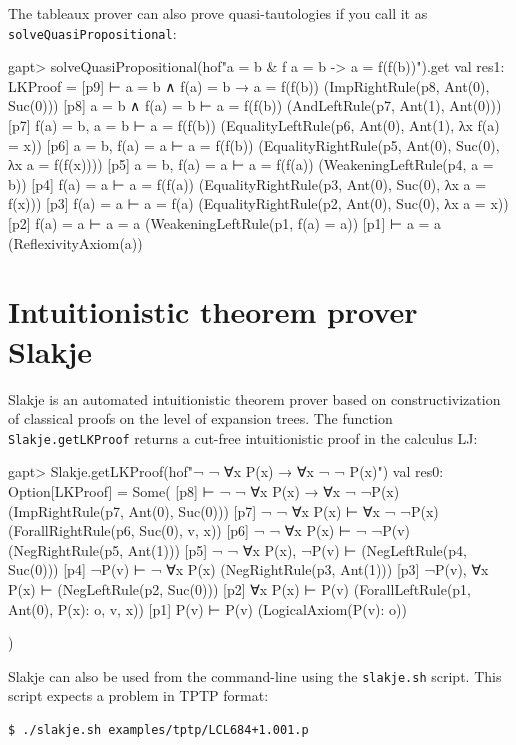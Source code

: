 \documentclass[a4paper,11pt]{book}
\begin{document}
The tableaux prover can also prove quasi-tautologies if you call it as \texttt{solveQuasiPropositional}:
\begin{clilisting}
gapt> solveQuasiPropositional(hof"a = b & f a = b -> a = f(f(b))").get
val res1: LKProof = [p9]  ⊢ a = b ∧ f(a) = b → a = f(f(b))    (ImpRightRule(p8, Ant(0), Suc(0)))
[p8] a = b ∧ f(a) = b ⊢ a = f(f(b))    (AndLeftRule(p7, Ant(1), Ant(0)))
[p7] f(a) = b, a = b ⊢ a = f(f(b))    (EqualityLeftRule(p6, Ant(0), Ant(1), λx f(a) = x))
[p6] a = b, f(a) = a ⊢ a = f(f(b))    (EqualityRightRule(p5, Ant(0), Suc(0), λx a = f(f(x))))
[p5] a = b, f(a) = a ⊢ a = f(f(a))    (WeakeningLeftRule(p4, a = b))
[p4] f(a) = a ⊢ a = f(f(a))    (EqualityRightRule(p3, Ant(0), Suc(0), λx a = f(x)))
[p3] f(a) = a ⊢ a = f(a)    (EqualityRightRule(p2, Ant(0), Suc(0), λx a = x))
[p2] f(a) = a ⊢ a = a    (WeakeningLeftRule(p1, f(a) = a))
[p1]  ⊢ a = a    (ReflexivityAxiom(a))

\end{clilisting}

\section{Intuitionistic theorem prover Slakje}

Slakje is an automated intuitionistic theorem prover based on
constructivization of classical proofs on the level of expansion trees.  The
function \texttt{Slakje.getLKProof} returns a cut-free intuitionistic proof in
the calculus LJ:
\begin{clilisting}
gapt> Slakje.getLKProof(hof"¬ ¬ ∀x P(x) → ∀x ¬ ¬ P(x)")
val res0: Option[LKProof] = Some(
  [p8]  ⊢ ¬ ¬ ∀x P(x) → ∀x ¬ ¬P(x)    (ImpRightRule(p7, Ant(0), Suc(0)))
[p7] ¬ ¬ ∀x P(x) ⊢ ∀x ¬ ¬P(x)    (ForallRightRule(p6, Suc(0), v, x))
[p6] ¬ ¬ ∀x P(x) ⊢ ¬ ¬P(v)    (NegRightRule(p5, Ant(1)))
[p5] ¬ ¬ ∀x P(x), ¬P(v) ⊢     (NegLeftRule(p4, Suc(0)))
[p4] ¬P(v) ⊢ ¬ ∀x P(x)    (NegRightRule(p3, Ant(1)))
[p3] ¬P(v), ∀x P(x) ⊢     (NegLeftRule(p2, Suc(0)))
[p2] ∀x P(x) ⊢ P(v)    (ForallLeftRule(p1, Ant(0), P(x): o, v, x))
[p1] P(v) ⊢ P(v)    (LogicalAxiom(P(v): o))

)

\end{clilisting}

Slakje can also be used from the command-line using the \texttt{slakje.sh}
script.  This script expects a problem in TPTP format:
\begin{lstlisting}
$ ./slakje.sh examples/tptp/LCL684+1.001.p
\end{lstlisting}
\end{document}
